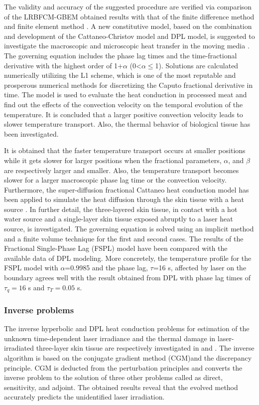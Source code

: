 \documentclass[sn-mathphys]{sn-jnl}%
\theoremstyle{thmstyleone}%
\theoremstyle{thmstyletwo}%
\theoremstyle{thmstylethree}%
\begin{document}
The validity and accuracy of the suggested procedure are verified via comparison of the LRBFCM-GBEM obtained results with that of the finite difference method \cite{LTurchan2017} and finite element method \cite{DKumar2017}. A new constitutive model, based on the combination and development of the Cattaneo-Christov model and DPL model, is suggested to investigate the macroscopic and microscopic heat transfer in the moving media \cite{LLiu2018}. The governing equation includes the phase lag times and the time-fractional derivative with the highest order of 1+$\alpha$ (0<$\alpha \le$1). Solutions are calculated numerically utilizing the L1 scheme, which is one of the most reputable and prosperous numerical methods for discretizing the Caputo fractional derivative in time. The model is used to evaluate the heat conduction in processed meat and find out the effects of the convection velocity on the temporal evolution of the temperature. It is concluded that a larger positive convection velocity leads to slower temperature transport. Also, the thermal behavior of biological tissue has been investigated.

It is obtained that the faster temperature transport occurs at smaller positions while it gets slower for larger positions when the fractional parameters, $\alpha$, and $\beta$ are respectively larger and smaller. Also, the temperature transport becomes slower for a larger macroscopic phase lag time or the convection velocity. Furthermore, the super-diffusion fractional Cattaneo heat conduction model has been applied to simulate the heat diffusion through the skin tissue with a heat source \cite{Goudarzi2019}. In further detail, the three-layered skin tissue, in contact with a hot water source and a single-layer skin tissue exposed abruptly to a laser heat source, is investigated. The governing equation is solved using an implicit method and a finite volume technique for the first and second cases. The results of the Fractional Single-Phase Lag (FSPL) model have been compared with the available data of DPL modeling. More concretely, the temperature profile for the FSPL model with $\alpha$=0.9985 and the phase lag, $\tau$=16 s, affected by laser on the boundary agrees well with the result obtained from DPL with phase lag times of $\tau_q=16$ s and $\tau_T=0.05$ s.

\subsubsection{Inverse problems}
The inverse hyperbolic and DPL heat conduction problems for estimation of the unknown time-dependent laser irradiance and the thermal damage in laser-irradiated three-layer skin tissue are respectively investigated in \cite{HLLee2015} and \cite{YCYang2017}. The inverse algorithm is based on the conjugate gradient method (CGM)and the discrepancy principle. CGM is deducted from the perturbation principles and converts the inverse problem to the solution of three other problems called as direct, sensitivity, and adjoint. The obtained results reveal that the evolved method accurately predicts the unidentified laser irradiation.
\end{document}

